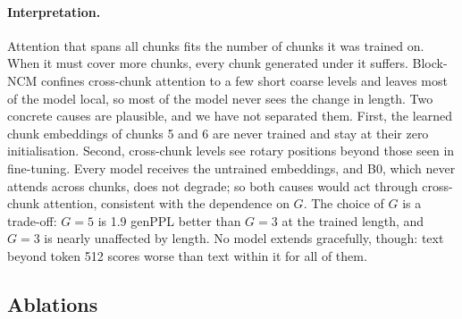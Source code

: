 \documentclass[10pt,twocolumn]{article}
\begin{document}
\paragraph{Interpretation.} Attention that spans all chunks fits the number of chunks it was trained on. When
it must cover more chunks, every chunk generated under it suffers. Block-NCM confines cross-chunk attention to
a few short coarse levels and leaves most of the model local, so most of the model never sees the change in length.
Two concrete causes are plausible, and we have not separated them. First, the learned chunk embeddings of chunks 5
and 6 are never trained and stay at their zero initialisation. Second, cross-chunk levels see rotary positions
beyond those seen in fine-tuning. Every model receives the untrained embeddings, and B0, which never attends across
chunks, does not degrade; so both causes would act through cross-chunk attention, consistent with the dependence
on $G$.
The choice of $G$ is a trade-off: $G{=}5$ is 1.9 genPPL better than $G{=}3$ at the trained length, and $G{=}3$ is
nearly unaffected by length. No model extends gracefully, though: text beyond token 512 scores worse than text within
it for all of them.

\subsection{Ablations}
\label{sec:ablations}
\end{document}
